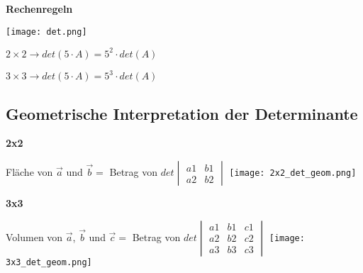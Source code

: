 \begin{multicols*}{3}
\textbf{Rechenregeln}

{\texttt{[image: det.png]}}

$2\times 2 \rightarrow det(5 \cdot A) = 5^2 \cdot det(A)$

$3\times 3 \rightarrow det(5 \cdot A) = 5^3 \cdot det(A)$

 \WhiteSpace
\subsection{Geometrische Interpretation der Determinante }
{\textbf{2x2}}

{Fläche von $\vec{a} $ und $ \vec{b} = $ Betrag von $ det \begin{vmatrix} a1 & b1  \\ a2 & b2 \end{vmatrix} $}
{\texttt{[image: 2x2\_det\_geom.png]}}




\textbf{3x3}

{Volumen von $\vec{a} $, $ \vec{b}$ und $\vec{c} = $ Betrag von $   det \begin{vmatrix} a1 & b1 & c1 \\ a2 & b2 & c2 \\ a3 & b3 & c3  \end{vmatrix}  $}
 {\texttt{[image: 3x3\_det\_geom.png]}}
\mbox{}
	
\end{multicols*} 


